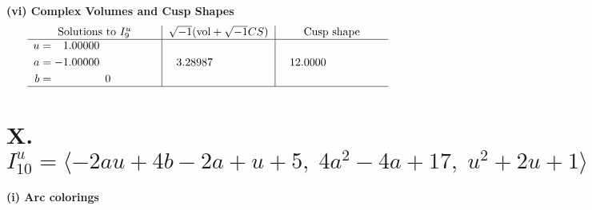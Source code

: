 \documentclass[1p]{elsarticle_modified}
\theoremstyle{definition}
\newcommand{\I}{\sqrt{-1}}
\begin{document}
\newpage\flushleft \textbf{(vi) Complex Volumes and Cusp Shapes}
$$\begin{array}{c|c|c}  
\text{Solutions to }I^u_{9}& \I (\text{vol} + \sqrt{-1}CS) & \text{Cusp shape}\\
 \hline 
\begin{aligned}
u &= \phantom{-}1.00000\phantom{ +0.000000I} \\
a &= -1.00000\phantom{ +0.000000I} \\
b &= \phantom{-0.000000 } 0\end{aligned}
 & \phantom{-}3.28987\phantom{ +0.000000I} & \phantom{-}12.0000\phantom{ +0.000000I}\\
 \hline 
 \end{array}$$\newpage\newpage\renewcommand{\arraystretch}{1}
\centering \section*{X. $I^u_{10}= \langle -2 a u+4 b-2 a+u+5,\;4 a^2-4 a+17,\;u^2+2 u+1 \rangle$}
\flushleft \textbf{(i) Arc colorings}\\
\end{document}
